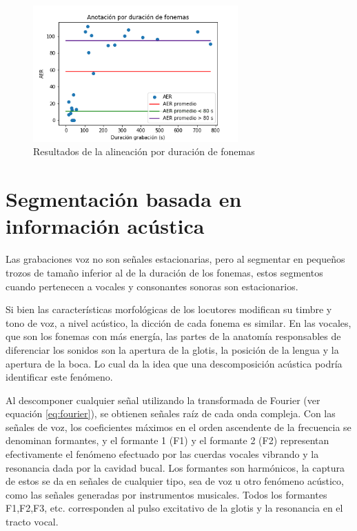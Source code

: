 \begin{figure}[H]
\caption{Resultados de la alineación por duración de fonemas}
\label{img:aer_duracion}
\begin{center}
\includegraphics[width=0.7\textwidth]{imagenes/04_03_aer_duracion_fonemas.png}
\end{center}
\end{figure}


\section{Segmentación basada en información acústica}

Las grabaciones voz no son señales estacionarias, pero al segmentar en pequeños trozos de tamaño inferior al de la duración de los fonemas, estos segmentos cuando pertenecen a vocales y consonantes sonoras son estacionarios.

Si bien las características morfológicas de los locutores modifican su timbre y tono de voz, a nivel acústico, la dicción de cada fonema es similar. En las vocales, que son los fonemas con más energía, las partes de la anatomía responsables de diferenciar los sonidos son la apertura de la glotis, la posici\'on de la lengua y la apertura de la boca. Lo cual da la idea que una descomposición acústica podría identificar este fenómeno.

Al descomponer cualquier señal utilizando la transformada de Fourier (ver equación \ref{eq:fourier}), se obtienen señales raíz de cada onda compleja. Con las señales de voz, los coeficientes máximos  en el orden ascendente de la frecuencia se denominan formantes, y el formante 1 (F1) y el formante 2 (F2) representan efectivamente el fenómeno efectuado por las cuerdas vocales vibrando y la resonancia dada por la cavidad bucal. Los formantes son harmónicos, la captura de estos se da en señales de cualquier tipo, sea de voz u otro fenómeno acústico, como las señales generadas por instrumentos musicales. Todos los formantes F1,F2,F3, etc. corresponden al pulso excitativo de la glotis y la resonancia en el tracto vocal.

